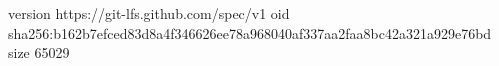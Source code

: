 version https://git-lfs.github.com/spec/v1
oid sha256:b162b7efced83d8a4f346626ee78a968040af337aa2faa8bc42a321a929e76bd
size 65029
